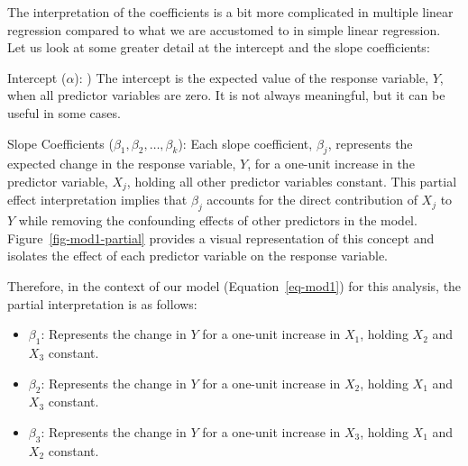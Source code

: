 \documentclass[
  letterpaper,
]{book}
\providecommand{\tightlist}{%
  \setlength{\itemsep}{0pt}\setlength{\parskip}{0pt}}\usepackage{longtable,booktabs,array}
\begin{document}
\begin{tcolorbox}[enhanced jigsaw, opacitybacktitle=0.6, toptitle=1mm, colframe=quarto-callout-note-color-frame, arc=.35mm, left=2mm, rightrule=.15mm, coltitle=black, opacityback=0, bottomrule=.15mm, bottomtitle=1mm, title=\textcolor{quarto-callout-note-color}{\faInfo}\hspace{0.5em}{The intercept and slope coefficients}, toprule=.15mm, colbacktitle=quarto-callout-note-color!10!white, titlerule=0mm, leftrule=.75mm, colback=white, breakable]

The interpretation of the coefficients is a bit more complicated in
multiple linear regression compared to what we are accustomed to in
simple linear regression. Let us look at some greater detail at the
intercept and the slope coefficients:

Intercept (\(\alpha\)): ) The intercept is the expected value of the
response variable, \(Y\), when all predictor variables are zero. It is
not always meaningful, but it can be useful in some cases.

Slope Coefficients (\(\beta_1, \beta_2, \ldots, \beta_k\)): Each slope
coefficient, \(\beta_j\), represents the expected change in the response
variable, \(Y\), for a one-unit increase in the predictor variable,
\(X_j\), holding all other predictor variables constant. This partial
effect interpretation implies that \(\beta_j\) accounts for the direct
contribution of \(X_j\) to \(Y\) while removing the confounding effects
of other predictors in the model. Figure~\ref{fig-mod1-partial} provides
a visual representation of this concept and isolates the effect of each
predictor variable on the response variable.

Therefore, in the context of our model (Equation~\ref{eq-mod1}) for this
analysis, the partial interpretation is as follows:

\begin{itemize}
\tightlist
\item
  \(\beta_1\): Represents the change in \(Y\) for a one-unit increase in
  \(X_1\), holding \(X_2\) and \(X_3\) constant.
\item
  \(\beta_2\): Represents the change in \(Y\) for a one-unit increase in
  \(X_2\), holding \(X_1\) and \(X_3\) constant.
\item
  \(\beta_3\): Represents the change in \(Y\) for a one-unit increase in
  \(X_3\), holding \(X_1\) and \(X_2\) constant.
\end{itemize}

\end{tcolorbox}
\end{document}
